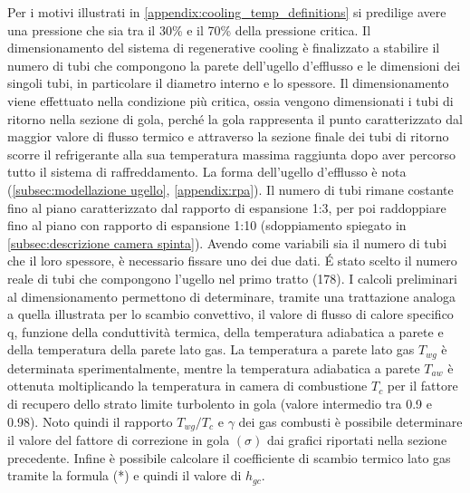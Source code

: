 Per i motivi illustrati in \autoref{appendix:cooling_temp_definitions} si predilige avere una pressione che sia tra il 30\% e il 70\% della pressione critica.
Il dimensionamento del sistema di regenerative cooling è finalizzato a stabilire il numero di tubi che compongono la parete dell'ugello d'efflusso e le dimensioni dei singoli tubi, in particolare il diametro interno e lo spessore. Il dimensionamento viene effettuato nella condizione più critica, ossia vengono dimensionati i tubi di ritorno nella sezione di gola, perché la gola rappresenta il punto caratterizzato dal maggior valore di flusso termico e attraverso la sezione finale dei tubi di ritorno scorre il refrigerante alla sua temperatura massima raggiunta dopo aver percorso tutto il sistema di raffreddamento. La forma dell'ugello d'efflusso è nota (\autoref{subsec:modellazione ugello}, \autoref{appendix:rpa}). Il numero di tubi rimane costante fino al piano caratterizzato dal rapporto di espansione 1:3, per poi raddoppiare fino al piano con rapporto di espansione 1:10 (sdoppiamento spiegato in \autoref{subsec:descrizione camera spinta}). Avendo come variabili sia il numero di tubi che il loro spessore, è necessario fissare uno dei due dati. \'E stato scelto il numero reale di tubi che compongono l'ugello nel primo tratto (178).
I calcoli preliminari al dimensionamento permettono di determinare, tramite una trattazione analoga a quella illustrata per lo scambio convettivo, il valore di flusso di calore specifico q, funzione della conduttività termica, della temperatura adiabatica a parete e della temperatura della parete lato gas. 
La temperatura a parete lato gas $T_{wg}$ è determinata sperimentalmente, mentre la temperatura adiabatica a parete $T_{aw}$ è ottenuta moltiplicando la temperatura in camera di combustione $T_c$ per il fattore di recupero dello strato limite turbolento in gola (valore intermedio tra 0.9 e 0.98). Noto quindi il rapporto $T_{wg}/T_c$ e $\gamma$ dei gas combusti è possibile determinare il valore del fattore di correzione in gola $\left( \sigma \right)$ dai grafici riportati nella sezione precedente. Infine è possibile calcolare il coefficiente di scambio termico lato gas tramite la formula (*) e quindi il valore di $h_{gc}$.

